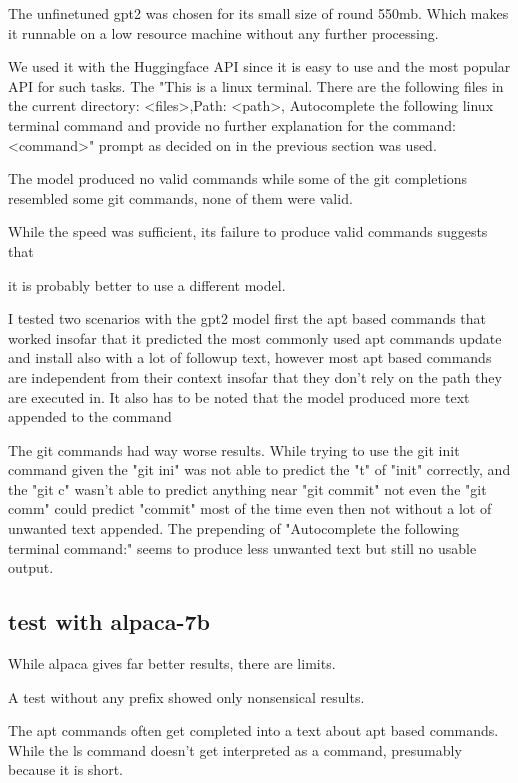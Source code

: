 The unfinetuned gpt2 was chosen for its small size of round 550mb. Which makes it runnable on a low resource machine without any further processing. 

We used it with the Huggingface API since it is easy to use and the most popular API for such tasks. The "This is a linux terminal. There are the following files in the current  directory: <files>,Path: <path>, Autocomplete the following linux terminal command and provide no further explanation for the command: <command>" prompt as decided on in the previous section was used.


The model produced no valid commands while some of the git  completions resembled some git commands, none of them were valid.

While the speed was sufficient, its failure to produce valid commands suggests that

it is probably better to use a different model. 





I tested two scenarios with the gpt2 model first the apt based commands that worked insofar that it predicted the most commonly used apt commands update and install also with a lot of followup text, however most apt based commands are independent from their context insofar that they don't rely on the path they are executed in. It also has to be noted that the model produced more text appended to the command 


The git commands had way worse results. While trying to use the git  init command given the "git ini" was not able to predict the "t" of "init" correctly, and the "git c" wasn't able to predict anything near "git commit" not even  the "git comm" could predict "commit" most of the time even then not without a lot of unwanted text appended. The prepending of "Autocomplete the following terminal command:" seems to produce less unwanted text but still no usable output. 

\subsection{test with alpaca-7b}
While alpaca gives far better results, there are limits.


A test without any prefix showed only nonsensical results.

The apt commands often get completed into a text about apt based commands. While the ls command doesn't get interpreted as a command, presumably because it is short.

